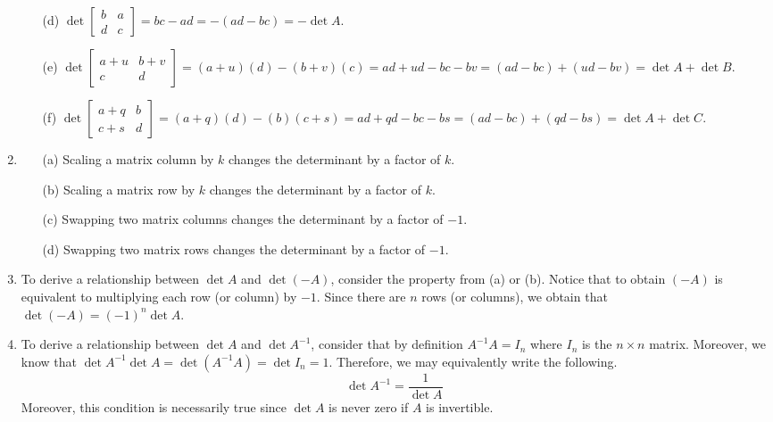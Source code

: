 \begin{SaveQuestion}
\begin{enumerate}
\begin{enumerate}
            \item[(d)] $\det\begin{bmatrix} b & a \\ d & c \end{bmatrix} = bc - ad = -(ad - bc) = -\det A$.

            \item[(e)] $\det\begin{bmatrix} a+u & b+v \\ c & d \end{bmatrix} = (a + u)(d) - (b + v)(c) = ad + ud - bc - bv = (ad - bc) + (ud - bv) = \det A + \det B$. 

            \item[(f)] $\det\begin{bmatrix} a+q & b \\ c+s & d \end{bmatrix} = (a + q)(d) - (b)(c + s) = ad + qd - bc - bs = (ad - bc) + (qd - bs) = \det A + \det C$. 
        \end{enumerate}
        \item
        \begin{itemize}
            \item[(a)] Scaling a matrix column by $k$ changes the determinant by a factor of $k$.
            \item[(b)] Scaling a matrix row by $k$ changes the determinant by a factor of $k$. 
            \item[(c)] Swapping two matrix columns changes the determinant by a factor of $-1$. 
            \item[(d)] Swapping two matrix rows changes the determinant by a factor of $-1$.
        \end{itemize}
        \item To derive a relationship between $\det A$ and $\det (-A)$, consider the property from (a) or (b). Notice that to obtain $(-A)$ is equivalent to multiplying each row (or column) by $-1$. Since there are $n$ rows (or columns), we obtain that $\det(-A) = (-1)^n \det A$. 

        \item To derive a relationship between $\det A$ and $\det A^{-1}$, consider that by definition $ A^{-1} A = I_n$ where $I_n$ is the $n \times n$ matrix. Moreover, we know that $\det A^{-1} \det A = \det (A^{-1}A) = \det I_n = 1$. Therefore, we may equivalently write the following.
        $$\det A^{-1} = \frac{1}{\det A}$$
        Moreover, this condition is necessarily true since $\det A$ is never zero if $A$ is invertible. 
    \end{enumerate}
\end{SaveQuestion}

